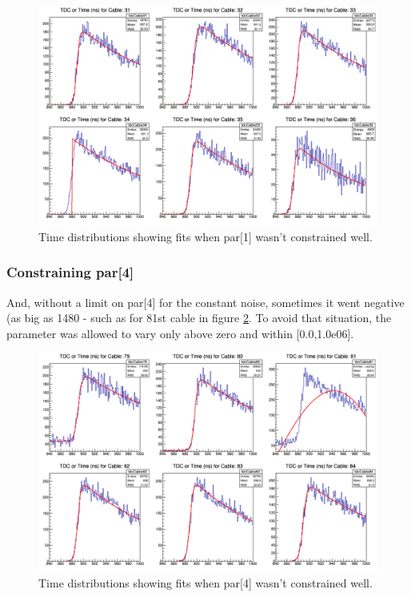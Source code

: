 \documentclass[12pt,epsfig]{article}
\begin{document}
\begin{figure}
    \centering
    \includegraphics[width=1.0\textwidth]{Figures/tdcForRun068_Cables31to36.png}
    \caption{Time distributions showing fits when par[1] wasn't constrained well.}
    \label{tdcSharp}
\end{figure}


\subsubsection{Constraining par[4]}
And, without a limit on par[4] for the constant noise, sometimes it went negative (as big 
as 1480 - such as for 81st cable in figure \ref{tdcNegNoise}.
To avoid that situation, the parameter was allowed to vary only above zero and within [0.0,1.0e06].

\begin{figure}
    \centering
    \includegraphics[width=1.0\textwidth]{Figures/tdcForRun068_Cables79to84.png}
    \caption{Time distributions showing fits when par[4] wasn't constrained well.}
    \label{tdcNegNoise}
\end{figure}
\end{document}
